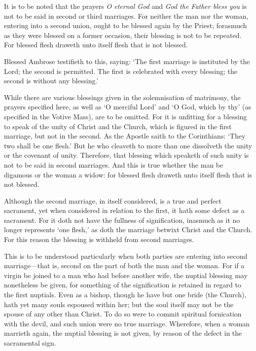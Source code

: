 \begin{rubric}
	It is to be noted that the prayers \emph{O eternal God} and \emph{God the Father bless you} is not to be said in second or third marriages. For neither the man nor the woman, entering into a second union, ought to be blessed again by the Priest; forasmuch as they were blessed on a former occasion, their blessing is not to be repeated. For blessed flesh draweth unto itself flesh that is not blessed.\par
	Blessed Ambrose testifieth to this, saying: `The first marriage is instituted by the Lord; the second is permitted. The first is celebrated with every blessing; the second is without any blessing.'
\end{rubric}
\begin{rubric}
	While there are various blessings given in the solemnisation of matrimony, the prayers specified here, as well as `O merciful Lord' and `O God, which by thy' (as specified in the Votive Mass), are to be omitted. For it is unfitting for a blessing to speak of the unity of Christ and the Church, which is figured in the first marriage, but not in the second. As the Apostle saith to the Corinthians: `They two shall be one flesh.' But he who cleaveth to more than one dissolveth the unity or the covenant of unity. Therefore, that blessing which speaketh of such unity is not to be said in second marriages. And this is true whether the man be digamous or the woman a widow: for blessed flesh draweth unto itself flesh that is not blessed.
\end{rubric}
\begin{rubric}
	Although the second marriage, in itself considered, is a true and perfect sacrament, yet when considered in relation to the first, it hath some defect as a sacrament. For it doth not have the fullness of signification, inasmuch as it no longer represents `one flesh,' as doth the marriage betwixt Christ and the Church. For this reason the blessing is withheld from second marriages.\par
	This is to be understood particularly when both parties are entering into second marriage---that is, second on the part of both the man and the woman. For if a virgin be joined to a man who had before another wife, the nuptial blessing may nonetheless be given, for something of the signification is retained in regard to the first nuptials. Even as a bishop, though he have but one bride (the Church), hath yet many souls espoused within her; but the soul itself may not be the spouse of any other than Christ. To do so were to commit spiritual fornication with the devil, and such union were no true marriage. Wherefore, when a woman marrieth again, the nuptial blessing is not given, by reason of the defect in the sacramental sign.
\end{rubric}

